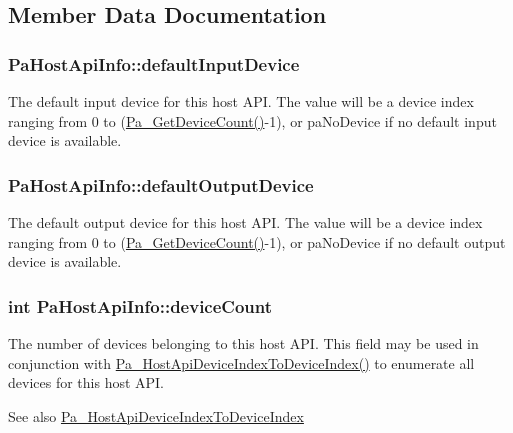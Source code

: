 \subsection{Member Data Documentation}
\hypertarget{struct_pa_host_api_info_a85a62057c3479d3efaa477d8562cf21d}{
\subsubsection[{default\+Input\+Device}]{ Pa\+Host\+Api\+Info\+::default\+Input\+Device}}\label{struct_pa_host_api_info_a85a62057c3479d3efaa477d8562cf21d}
The default input device for this host A\+P\+I. The value will be a device index ranging from 0 to (\hyperlink{portaudio_8h_acfe4d3c5ec1a343f459981bfa2057f8d}{Pa\+\_\+\+Get\+Device\+Count()}-\/1), or pa\+No\+Device if no default input device is available. \hypertarget{struct_pa_host_api_info_a62632690b5f7906d3c9bfdab91e7f4b2}{
\subsubsection[{default\+Output\+Device}]{ Pa\+Host\+Api\+Info\+::default\+Output\+Device}}\label{struct_pa_host_api_info_a62632690b5f7906d3c9bfdab91e7f4b2}
The default output device for this host A\+P\+I. The value will be a device index ranging from 0 to (\hyperlink{portaudio_8h_acfe4d3c5ec1a343f459981bfa2057f8d}{Pa\+\_\+\+Get\+Device\+Count()}-\/1), or pa\+No\+Device if no default output device is available. \hypertarget{struct_pa_host_api_info_a44e3adfaba0117a6780e2493468c96b1}{
\subsubsection[{device\+Count}]{\setlength{\rightskip}{0pt plus 5cm}int Pa\+Host\+Api\+Info\+::device\+Count}}\label{struct_pa_host_api_info_a44e3adfaba0117a6780e2493468c96b1}
The number of devices belonging to this host A\+P\+I. This field may be used in conjunction with \hyperlink{portaudio_8h_a54f306b5e5258323c95a27c5722258cd}{Pa\+\_\+\+Host\+Api\+Device\+Index\+To\+Device\+Index()} to enumerate all devices for this host A\+P\+I. \begin{DoxySeeAlso}{See also}
\hyperlink{portaudio_8h_a54f306b5e5258323c95a27c5722258cd}{Pa\+\_\+\+Host\+Api\+Device\+Index\+To\+Device\+Index} 
\end{DoxySeeAlso}
